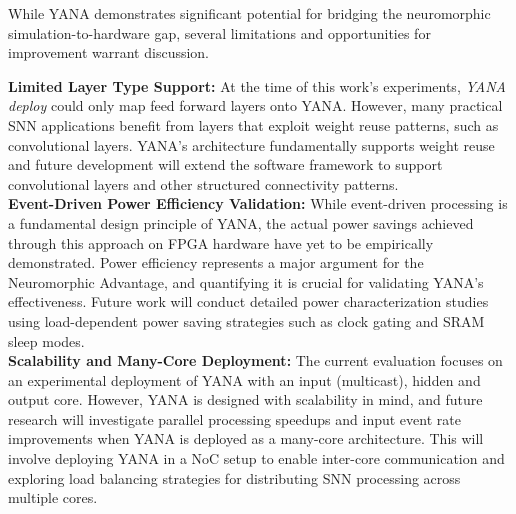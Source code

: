 While YANA demonstrates significant potential for bridging the neuromorphic simulation-to-hardware gap, several limitations and opportunities for improvement warrant discussion.

\newpage\noindent\textbf{Limited Layer Type Support:}
At the time of this work's experiments, \textit{YANA deploy} could only map feed forward layers onto YANA. However, many practical \ac{SNN} applications benefit from layers that exploit weight reuse patterns, such as convolutional layers. YANA's architecture fundamentally supports weight reuse and future development will extend the software framework to support convolutional layers and other structured connectivity patterns.
\\
\textbf{Event-Driven Power Efficiency Validation:}
While event-driven processing is a fundamental design principle of YANA, the actual power savings achieved through this approach on FPGA hardware have yet to be empirically demonstrated. Power efficiency represents a major argument for the Neuromorphic Advantage, and quantifying it is crucial for validating YANA's effectiveness. Future work will conduct detailed power characterization studies using load-dependent power saving strategies such as clock gating and SRAM sleep modes.
\\
\textbf{Scalability and Many-Core Deployment:}
The current evaluation focuses on an experimental deployment of YANA with an input (multicast), hidden and output core. However, YANA is designed with scalability in mind, and future research will investigate parallel processing speedups and input event rate improvements when YANA is deployed as a many-core architecture. This will involve deploying YANA in a \ac{NoC} setup to enable inter-core communication and exploring load balancing strategies for distributing \ac{SNN} processing across multiple cores.